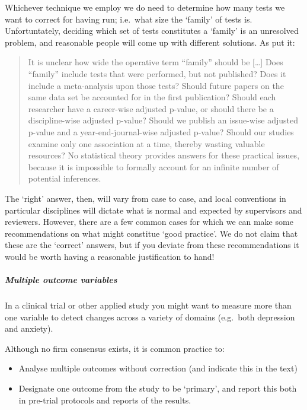 \documentclass[]{article}
\providecommand{\tightlist}{%
  \setlength{\itemsep}{0pt}\setlength{\parskip}{0pt}}
\let\oldsubparagraph\subparagraph
\renewcommand{\subparagraph}[1]{\oldsubparagraph{#1}\mbox{}}
\theoremstyle{definition}
\theoremstyle{definition}
\theoremstyle{definition}
\theoremstyle{remark}
\begin{document}
Whichever technique we employ we do need to determine how many tests we
want to correct for having run; i.e.~what size the `family' of tests is.
Unfortuntately, deciding which set of tests constitutes a `family' is an
unresolved problem, and reasonable people will come up with different
solutions. As \citet{feise2002multiple} put it:

\begin{quote}
It is unclear how wide the operative term ``family'' should be
{[}\ldots{}{]} Does ``family'' include tests that were performed, but
not published? Does it include a meta-analysis upon those tests? Should
future papers on the same data set be accounted for in the first
publication? Should each researcher have a career-wise adjusted p-value,
or should there be a discipline-wise adjusted p-value? Should we publish
an issue-wise adjusted p-value and a year-end-journal-wise adjusted
p-value? Should our studies examine only one association at a time,
thereby wasting valuable resources? No statistical theory provides
answers for these practical issues, because it is impossible to formally
account for an infinite number of potential inferences.
\end{quote}

The `right' answer, then, will vary from case to case, and local
conventions in particular disciplines will dictate what is normal and
expected by supervisors and reviewers. However, there are a few common
cases for which we can make some recommendations on what might constitue
`good practice'. We do not claim that these are the `correct' answers,
but if you deviate from these recommendations it would be worth having a
reasonable justification to hand!

\subparagraph{Multiple outcome
variables}\label{multiple-outcome-variables}

In a clinical trial or other applied study you might want to measure
more than one variable to detect changes across a variety of domains
(e.g.~both depression and anxiety).

Although no firm consensus exists, it is common practice to:

\begin{itemize}
\tightlist
\item
  Analyse multiple outcomes without correction (and indicate this in the
  text)
\item
  Designate one outcome from the study to be `primary', and report this
  both in pre-trial protocols and reports of the results.
\end{itemize}
\end{document}
